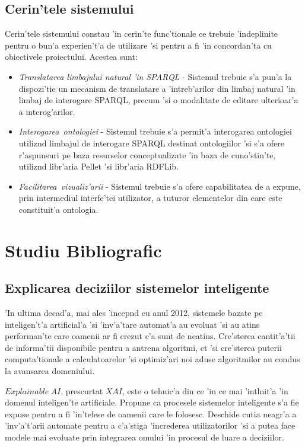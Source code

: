 \documentclass[12pt,a4paper,twoside]{report}
\begin{document}
\section{Cerin'tele sistemului}

Cerin'tele sistemului constau 'in cerin'te func'tionale ce trebuie 'indeplinite pentru o bun'a experien't'a de utilizare 'si pentru a fi 'in concordan'ta cu obiectivele proiectului. Acestea sunt:

\begin{itemize}
    \item {\it Translatarea limbajului natural 'in SPARQL} - Sistemul trebuie s'a pun'a la dispozi'tie un mecanism de translatare a 'intreb'arilor din limbaj natural 'in limbaj de interogare SPARQL, precum 'si o modalitate de editare ulterioar'a a interog'arilor.
    \item {\it Interogarea\ ontologiei} -  Sistemul trebuie s'a permit'a interogarea ontologiei utiliz\ia nd limbajul de interogare SPARQL destinat ontologiilor 'si s'a ofere r'aspunsuri pe baza resurselor conceptualizate 'in baza de cuno'stin'te, utiliz\ia nd libr'aria Pellet 'si libr'aria RDFLib.
    \item {\it Facilitarea\ vizualiz'arii} - Sistemul trebuie s'a ofere capabilitatea de a expune, prin intermediul interfe'tei utilizator, a tuturor elementelor din care este constituit'a ontologia.
\end{itemize}

\chapter{Studiu Bibliografic}
\label{sec:bibliographic_research}

\section{Explicarea deciziilor sistemelor inteligente}
'In ultima decad'a, mai ales 'incep\ia nd cu anul 2012, sistemele bazate pe inteligen't'a artificial'a 'si 'inv'a'tare automat'a au evoluat 'si au atins performan'te care oamenii ar fi crezut c'a sunt de neatins. Cre'sterea cantit'a'tii de informa'tii disponibile pentru a antrena algoritmi, c\ia t 'si cre'sterea puterii computa'tionale a calculatoarelor 'si optimiz'ari noi aduse algoritmilor au condus la avansarea domeniului.

$Explainable\ AI$, prescurtat $XAI$, este o tehnic'a din ce 'in ce mai 'int\ia lnit'a 'in domenul inteligen'te artificiale. Propune ca procesele sistemelor inteligente s'a fie expuse pentru a fi 'in'telese de oamenii care le folosesc. Deschide cutia neagr'a a 'inv'a't'arii automate pentru a c'a'stiga 'increderea utilizatorilor 'si a putea face modele mai evoluate prin integrarea omului 'in procesul de luare a deciziilor. 
\end{document}
